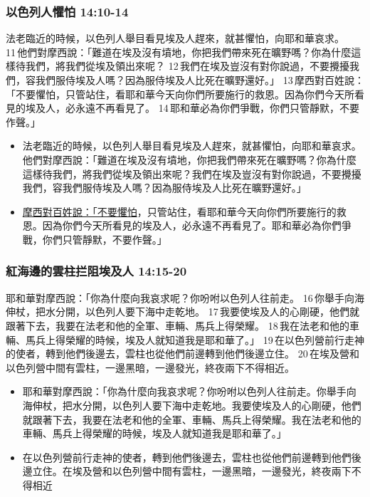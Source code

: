 \subsubsection{以色列人懼怕 14:10-14}
法老臨近的時候，以色列人舉目看見埃及人趕來，就甚懼怕，向耶和華哀求。 11 他們對摩西說：「難道在埃及沒有墳地，你把我們帶來死在曠野嗎？你為什麼這樣待我們，將我們從埃及領出來呢？ 12 我們在埃及豈沒有對你說過，不要攪擾我們，容我們服侍埃及人嗎？因為服侍埃及人比死在曠野還好。」 13 摩西對百姓說：「不要懼怕，只管站住，看耶和華今天向你們所要施行的救恩。因為你們今天所看見的埃及人，必永遠不再看見了。 14 耶和華必為你們爭戰，你們只管靜默，不要作聲。」

\begin{itemize} 
\itemsep-.35em 
\item 法老臨近的時候，以色列人舉目看見埃及人趕來，就甚懼怕，向耶和華哀求。他們對摩西說：「難道在埃及沒有墳地，你把我們帶來死在曠野嗎？你為什麼這樣待我們，將我們從埃及領出來呢？我們在埃及豈沒有對你說過，不要攪擾我們，容我們服侍埃及人嗎？因為服侍埃及人比死在曠野還好。」 
\item \underline{摩西對百姓說：「不要懼怕}，只管站住，看耶和華今天向你們所要施行的救恩。因為你們今天所看見的埃及人，必永遠不再看見了。耶和華必為你們爭戰，你們只管靜默，不要作聲。」
\end{itemize}

\subsubsection{紅海邊的雲柱拦阻埃及人 14:15-20}
耶和華對摩西說：「你為什麼向我哀求呢？你吩咐以色列人往前走。 16 你舉手向海伸杖，把水分開，以色列人要下海中走乾地。 17 我要使埃及人的心剛硬，他們就跟著下去，我要在法老和他的全軍、車輛、馬兵上得榮耀。 18 我在法老和他的車輛、馬兵上得榮耀的時候，埃及人就知道我是耶和華了。」 19 在以色列營前行走神的使者，轉到他們後邊去，雲柱也從他們前邊轉到他們後邊立住。 20 在埃及營和以色列營中間有雲柱，一邊黑暗，一邊發光，終夜兩下不得相近。

\begin{itemize} 
\itemsep-.35em 
\item 耶和華對摩西說：「你為什麼向我哀求呢？你吩咐以色列人往前走。你舉手向海伸杖，把水分開，以色列人要下海中走乾地。我要使埃及人的心剛硬，他們就跟著下去，我要在法老和他的全軍、車輛、馬兵上得榮耀。我在法老和他的車輛、馬兵上得榮耀的時候，埃及人就知道我是耶和華了。」 
\item 在以色列營前行走神的使者，轉到他們後邊去，雲柱也從他們前邊轉到他們後邊立住。在埃及營和以色列營中間有雲柱，一邊黑暗，一邊發光，終夜兩下不得相近
\end{itemize}

